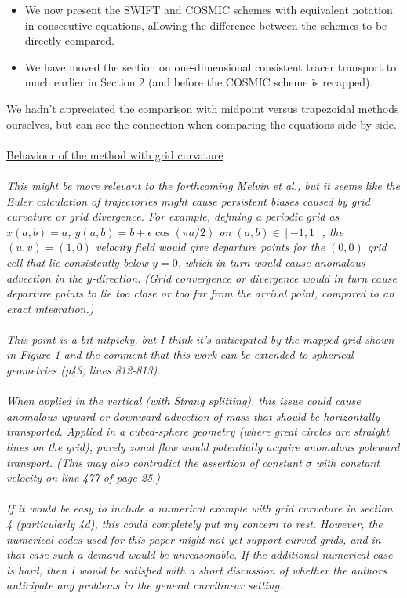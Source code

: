 \documentclass[11pt,a4paper]{article}
\begin{document}
\begin{itemize}
    \item We now present the SWIFT and COSMIC schemes with equivalent notation in consecutive equations, allowing the difference between the schemes to be directly compared.
    \item We have moved the section on one-dimensional consistent tracer transport to much earlier in Section 2 (and before the COSMIC scheme is recapped).
\end{itemize}
We hadn't appreciated the comparison with midpoint versus trapezoidal methods ourselves, but can see the connection when comparing the equations side-by-side. \\
\\
\underline{Behaviour of the method with grid curvature} \\
\\
\textit{This might be more relevant to the forthcoming Melvin et al., but it seems like the Euler calculation of trajectories might cause persistent biases caused by grid curvature or grid divergence.  For example, defining a periodic grid as $x(a,b) = a$, $y(a,b) = b + \epsilon \cos(\pi a/2)$ on $(a,b) \in [-1,1]$, the $(u,v) = (1,0)$ velocity field would give departure points for the $(0,0)$ grid cell that lie consistently below $y=0$, which in turn would cause anomalous advection in the $y$-direction.  (Grid convergence or divergence would in turn cause departure points to lie too close or too far from the arrival point, compared to an exact integration.) \\
\\
This point is a bit nitpicky, but I think it's anticipated by the mapped grid shown in Figure 1 and the comment that this work can be extended to spherical geometries (p43, lines 812-813). \\
\\
When applied in the vertical (with Strang splitting), this issue could cause anomalous upward or downward advection of mass that should be horizontally transported.  Applied in a cubed-sphere geometry (where great circles are straight lines on the grid), purely zonal flow would potentially acquire anomalous poleward transport.  (This may also contradict the assertion of constant $\sigma$ with constant velocity on line 477 of page 25.) \\
\\
If it would be easy to include a numerical example with grid curvature in section 4 (particularly 4d), this could completely put my concern to rest.  However, the numerical codes used for this paper might not yet support curved grids, and in that case such a demand would be unreasonable.  If the additional numerical case is hard, then I would be satisfied with a short discussion of whether the authors anticipate any problems in the general curvilinear setting.} \\
\end{document}
